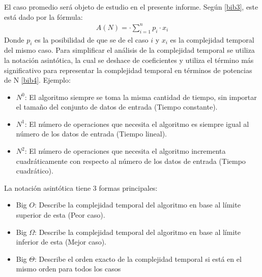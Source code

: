 El caso promedio será objeto de estudio en el presente informe. Según \ref{bib3}, este está dado por la fórmula: 
\begin{align*}
    A(N) = \cdot \sum_{i=1}^{n} p_i \cdot x_i
\end{align*}
Donde $p_i$ es la posibilidad de que se de el caso $i$ y $x_i$ es la complejidad temporal del mismo caso. Para simplificar el análisis de la complejidad temporal se utiliza la notación asintótica, la cual se deshace de coeficientes y utiliza el término más significativo para representar la complejidad temporal en términos de potencias de N \ref{bib4}. Ejemplo:
\begin{itemize}
    \item $N^0$: El algoritmo siempre se toma la misma cantidad de tiempo, sin importar el tamaño del conjunto de datos de entrada (Tiempo constante).
    \item $N^1$: El número de operaciones que necesita el algoritmo es siempre igual al número de los datos de entrada (Tiempo lineal).
    \item $N^2$: El número de operaciones que necesita el algoritmo incrementa cuadráticamente con respecto al número de los datos de entrada (Tiempo cuadrático).
\end{itemize}
La notación asintótica tiene 3 formas principales:
\begin{itemize}
    \item Big $O$: Describe la complejidad temporal del algoritmo en base al límite superior de esta (Peor caso).
    \item Big $\Omega$: Describe la complejidad temporal del algoritmo en base al límite inferior de esta (Mejor caso).
    \item Big $\Theta$: Describe el orden exacto de la complejidad temporal si está en el mismo orden para todos los casos
\end{itemize}
